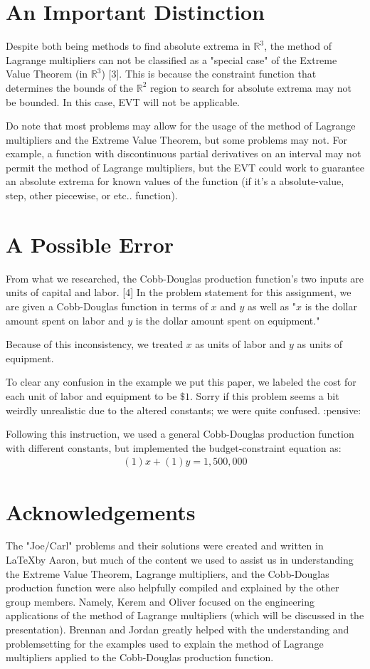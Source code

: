 \setcounter{chapter}{11}
\chapter{An Important Distinction}
Despite both being methods to find absolute extrema in $\mathbb{R}^3$, the method of Lagrange multipliers can not be classified as a "special case" of the Extreme Value Theorem (in $\mathbb{R}^3$) [3].
This is because the constraint function that determines the bounds of the $\mathbb{R}^2$ region to search for absolute extrema may not be bounded.
In this case, EVT will not be applicable.

Do note that most problems may allow for the usage of the method of Lagrange multipliers and the Extreme Value Theorem, but some problems may not.
For example, a function with discontinuous partial derivatives on an interval may not permit the method of Lagrange multipliers, but the EVT could work to guarantee an absolute extrema for known values of the function (if it's a absolute-value, step, other piecewise, or etc.. function).
\setcounter{chapter}{12}
\chapter{A Possible Error}
From what we researched, the Cobb-Douglas production function's two inputs are units of capital and labor. [4]
In the problem statement for this assignment, we are given a Cobb-Douglas function in terms of $x$ and $y$ as well as "$x$ is the dollar amount spent on labor and $y$ is the dollar amount spent on equipment."

Because of this inconsistency, we treated $x$ as units of labor and $y$ as units of equipment.

To clear any confusion in the example we put this paper, we labeled the cost for each unit of labor and equipment to be $\$1$.
Sorry if this problem seems a bit weirdly unrealistic due to the altered constants; we were quite confused. :pensive:

Following this instruction, we used a general Cobb-Douglas production function with different constants, but implemented the budget-constraint equation as:
\begin{align*}
	(1)x + (1)y = 1,500,000
\end{align*}
\setcounter{chapter}{13}
\chapter{Acknowledgements}
The "Joe/Carl" problems and their solutions were created and written in \LaTeX\space by Aaron, but much of the content we used to assist us in understanding the Extreme Value Theorem, Lagrange multipliers, and the Cobb-Douglas production function were also helpfully compiled and explained by the other group members.
Namely, Kerem and Oliver focused on the engineering applications of the method of Lagrange multipliers (which will be discussed in the presentation). Brennan and Jordan greatly helped with the understanding and problemsetting for the examples used to explain the method of Lagrange multipliers applied to the Cobb-Douglas production function.

